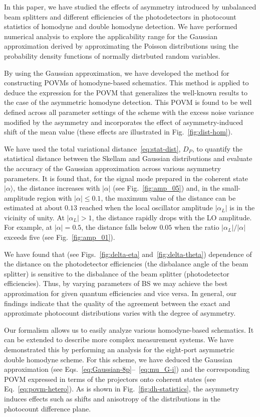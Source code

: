 \documentclass[%
reprint,
superscriptaddress,
 amsmath,amssymb,amsfonts,
 aps,
 pra,
 longbibliography
]{revtex4-2}
\newcommand{\ket}[1]{\ensuremath{|{#1}\rangle}}
\begin{document}
In this paper,
we have studied the effects of asymmetry
introduced by unbalanced beam splitters and different efficiencies of the photodetectors
in photocount statistics of homodyne and double homodyne detection.
We have performed numerical analysis to explore the applicability range for
the Gaussian approximation derived by approximating
the Poisson distributions using the probability density functions of
normally distrbuted random variables.

By using the Gaussian approximation,
we have developed
the method for constructing POVMs of homodyne-based
schematics.
This method is applied to deduce
the expression for the POVM
that generalizes the well-known results to the case of the asymmetric homodyne detection.
This POVM is found to be well defined across all  parameter settings of the scheme
with the excess noise variance modified by the asymmetry 
and incorporates the effect of asymmetry-induced shift of the mean value
(these effects are illustrated in Fig.~\ref{fig:dist-hom}).


We have used the total variational distance~\eqref{eq:stat-dist}, $D_P$,
to quantify the statistical distance between the Skellam and Gaussian distributions
and evaluate the accuracy of the Gaussian approximation across various asymmetry parameters.
It is found that, for the signal mode prepared in the coherent state $\ket{\alpha}$,
the distance increases with $|\alpha|$ (see Fig.~\ref{fig:amp_05}) and,
in the small-amplitude region with $|\alpha|\le 0.1$,
the maximum value of the distance can be estimated at about $0.13$
reached when the local oscillator amplitude $|\alpha_L|$ is in
the vicinity of unity. At $|\alpha_L|>1$, the distance rapidly drops with
the LO amplitude. For example, at $|\alpha|=0.5$,
the distance falls below $0.05$ when the ratio $|\alpha_L|/|\alpha|$ exceeds five
(see Fig.~\ref{fig:amp_01}).

We have found that
(see Figs.~\ref{fig:delta-eta} and~\ref{fig:delta-theta})
dependence of the distance on
the photodetector efficiencies
(the disbalance angle of the beam splitter)
is sensitive to the disbalance of the beam splitter
(photodetector efficiencies).
Thus,
by varying parameters of BS we may achieve the best approximation for given
quantum efficiencies and vice versa.
In general,
our findings indicate that the quality of the agreement between
the exact and approximate photocount distributions varies with
the degree of asymmetry.


Our formalism allows us to easily analyze various homodyne-based schematics. It can be
extended to describe more complex measurement systems.
We have demonstrated this by performing an analysis for
the eight-port asymmetric  double homodyne scheme.
For this scheme,
we have deduced the Gaussian approximation
(see Eqs.~\eqref{eq:Gaussian-8p}--~\eqref{eq:mu_G-i})
and the corresponding POVM expressed in terms of the
projectors onto coherent states (see Eq.~\eqref{eq:povm-hetero}).
As is shown in Fig.~\ref{fig:dh-statistics},
the asymmetry induces effects such as shifts and
anisotropy of the distributions in the photocount difference plane. 
\end{document}
